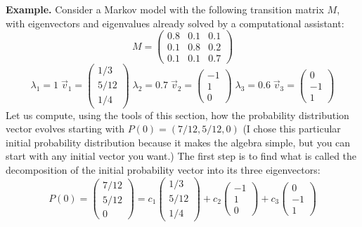 \documentclass[
  letterpaper,
  DIV=11,
  numbers=noendperiod]{scrreprt}
\begin{document}
\textbf{Example.} Consider a Markov model with the following transition
matrix \(M\), with eigenvectors and eigenvalues already solved by a
computational assistant:
\[ M = \left(\begin{array}{ccc} 0.8 & 0.1  & 0.1  \\ 0.1 & 0.8 & 0.2 \\ 0.1 & 0.1 & 0.7 \end{array}\right)\]
\[ \lambda_1 = 1 \; \vec v_1= \left(\begin{array}{c} 1/3     \\  5/12  \\ 1/4 \end{array}\right) \; \lambda_2 = 0.7  \;  \vec v_2= \left(\begin{array}{c} -1   \\ 1  \\ 0 \end{array}\right) \; \lambda_3 = 0.6  \;  \vec v_3= \left(\begin{array}{c} 0  \\ -1  \\ 1 \end{array}\right)\]
Let us compute, using the tools of this section, how the probability
distribution vector evolves starting with \(P(0) = (7/12,5/12,0)\) (I
chose this particular initial probability distribution because it makes
the algebra simple, but you can start with any initial vector you want.)
The first step is to find what is called the decomposition of the
initial probability vector into its three eigenvectors:
\[P(0)= \left(\begin{array}{c} 7/12 \\ 5/12  \\ 0 \end{array}\right) =  c_1\left(\begin{array}{c} 1/3     \\  5/12  \\ 1/4 \end{array}\right) + c_2 \left(\begin{array}{c} -1   \\ 1  \\ 0 \end{array}\right) + c_3\left(\begin{array}{c} 0  \\ -1  \\ 1 \end{array}\right)\]
\end{document}
